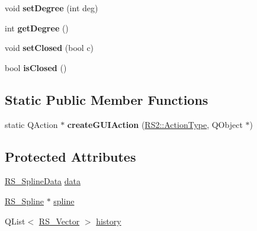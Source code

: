 \begin{DoxyCompactItemize}
\item 
\hypertarget{classRS__ActionDrawSpline_a3e12b10f56b6ef34c0809b6f61ad57ff}{void {\bfseries set\-Degree} (int deg)}\label{classRS__ActionDrawSpline_a3e12b10f56b6ef34c0809b6f61ad57ff}

\item 
\hypertarget{classRS__ActionDrawSpline_adfaf20952b01fa001080345b769b379d}{int {\bfseries get\-Degree} ()}\label{classRS__ActionDrawSpline_adfaf20952b01fa001080345b769b379d}

\item 
\hypertarget{classRS__ActionDrawSpline_ac3bb404fa8d63ad9bfa71beb30198a07}{void {\bfseries set\-Closed} (bool c)}\label{classRS__ActionDrawSpline_ac3bb404fa8d63ad9bfa71beb30198a07}

\item 
\hypertarget{classRS__ActionDrawSpline_abc9e264a0db96318803c8778b1edebcb}{bool {\bfseries is\-Closed} ()}\label{classRS__ActionDrawSpline_abc9e264a0db96318803c8778b1edebcb}

\end{DoxyCompactItemize}
\subsection*{Static Public Member Functions}
\begin{DoxyCompactItemize}
\item 
\hypertarget{classRS__ActionDrawSpline_afcec056ecad439cb727e22141c638cb8}{static Q\-Action $\ast$ {\bfseries create\-G\-U\-I\-Action} (\hyperlink{classRS2_afe3523e0bc41fd637b892321cfc4b9d7}{R\-S2\-::\-Action\-Type}, Q\-Object $\ast$)}\label{classRS__ActionDrawSpline_afcec056ecad439cb727e22141c638cb8}

\end{DoxyCompactItemize}
\subsection*{Protected Attributes}
\begin{DoxyCompactItemize}
\item 
\hyperlink{classRS__SplineData}{R\-S\-\_\-\-Spline\-Data} \hyperlink{classRS__ActionDrawSpline_ac958c421731777f66d4d7ebc3a72fd8d}{data}
\item 
\hyperlink{classRS__Spline}{R\-S\-\_\-\-Spline} $\ast$ \hyperlink{classRS__ActionDrawSpline_ad2d70b6a113c618cdd3bc50adb1a327e}{spline}
\item 
Q\-List$<$ \hyperlink{classRS__Vector}{R\-S\-\_\-\-Vector} $>$ \hyperlink{classRS__ActionDrawSpline_ae9165efc071ea5b8c46fee97743922e8}{history}
\end{DoxyCompactItemize}
